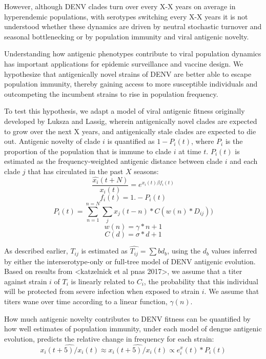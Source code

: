 \documentclass[11pt,oneside,letterpaper]{article}
\begin{document}
However, although DENV clades turn over every X-X years on average in hyperendemic populations, with serotypes switching every X-X years
it is not understood whether these dynamics are driven by neutral stochastic turnover and seasonal bottlenecking or by population immunity and viral antigenic novelty.


Understanding how antigenic phenotypes contribute to viral population dynamics has important applications for epidemic surveillance and vaccine design.
We hypothesize that antigenically novel strains of DENV are better able to escape population immunity, thereby gaining access to more susceptible individuals and outcompeting the incumbent strains to rise in population frequency.

To test this hypothesis, we adapt a model of viral antigenic fitness originally developed by Luksza and Lassig, wherein antigenically novel clades are expected to grow over the next X years, and antigenically stale clades are expected to die out.
Antigenic novelty of clade $i$ is quantified as $1 - P_i(t)$, where $P_i$ is the proportion of the population that is immune to clade $i$ at time $t$.
$P_i(t)$ is estimated as the frequency-weighted antigenic distance between clade $i$ and each clade $j$ that has circulated in the past $X$ seasons:
\pagebreak
$$\frac{\hat{x_i}(t+N)}{x_i(t)} = e^{x_i(t) \beta f_i(t)}$$
$$ f_i(t) = 1. - P_i(t)$$
$$P_i(t) = \sum_{n=1}^{n=N} \sum_{j} x_j(t-n) * C(w(n) * D_{ij}))$$
$$ w(n) = \gamma*n + 1$$
$$ C(d) = \sigma*d + 1$$

As described earlier, $T_{ij}$ is estimated as $\hat{T_{ij}} = \sum{b} d_b$, using the $d_b$ values inferred by either the interserotype-only or full-tree model of DENV antigenic evolution.
Based on results from <katzelnick et al pnas 2017>, we assume that a titer against strain $i$ of $T_i$ is linearly related to $C_i$, the  probability that this individual will be protected from severe infection when exposed to strain $i$.
We assume that titers wane over time according to a linear function, $\gamma(n)$.

How much antigenic novelty contributes to DENV fitness can be quantified by how well estimates of population immunity, under each model of dengue antigenic evolution, predicts the relative change in frequency for each strain: $$\hat{x_i(t+5)/x_i(t)} \approx \hat{x_i(t+5)/x_i(t)} \propto e^x_i(t) * P_i(t)$$
\end{document}
